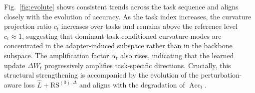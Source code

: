 \documentclass{article}
\theoremstyle{plain}
\theoremstyle{definition}
\theoremstyle{remark}
\begin{document}


Fig.~\ref{fig:evolute} shows consistent trends across the task sequence and aligns closely with the evolution of accuracy.
As the task index increases, the curvature projection ratio $c_t$ increases over tasks and remains above the reference level $c_t\approx 1$, suggesting that dominant task-conditioned curvature modes are concentrated in the adapter-induced subspace rather than in the backbone subspace.
The amplification factor $\alpha_t$ also rises, indicating that the learned update $\Delta W_t$ progressively amplifies task-specific directions.
Crucially, this structural strengthening is accompanied by the evolution of the perturbation-aware loss $\hat L+\mathrm{RS}^{(0),\Delta}$ and aligns with the degradation of $\operatorname{Acc}_t$.
\end{document}
